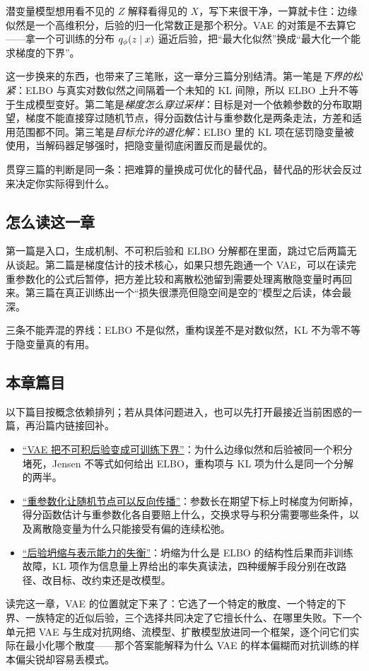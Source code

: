 潜变量模型想用看不见的 \(Z\) 解释看得见的 \(X\)，写下来很干净，一算就卡住：边缘似然是一个高维积分，后验的归一化常数正是那个积分。VAE 的对策是不去算它——拿一个可训练的分布 \(q_\phi(z\mid x)\) 逼近后验，把``最大化似然''换成``最大化一个能求梯度的下界''。

这一步换来的东西，也带来了三笔账，这一章分三篇分别结清。第一笔是\emph{下界的松紧}：ELBO 与真实对数似然之间隔着一个未知的 KL 间隙，所以 ELBO 上升不等于生成模型变好。第二笔是\emph{梯度怎么穿过采样}：目标是对一个依赖参数的分布取期望，梯度不能直接穿过随机节点，得分函数估计与重参数化是两条走法，方差和适用范围都不同。第三笔是\emph{目标允许的退化解}：ELBO 里的 KL 项在惩罚隐变量被使用，当解码器足够强时，把隐变量彻底闲置反而是最优的。

贯穿三篇的判断是同一条：把难算的量换成可优化的替代品，替代品的形状会反过来决定你实际得到什么。

\subsection{怎么读这一章}

第一篇是入口，生成机制、不可积后验和 ELBO 分解都在里面，跳过它后两篇无从谈起。第二篇是梯度估计的技术核心，如果只想先跑通一个 VAE，可以在读完重参数化的公式后暂停，把方差比较和离散松弛留到需要处理离散隐变量时再回来。第三篇在真正训练出一个``损失很漂亮但隐空间是空的''模型之后读，体会最深。

三条不能弄混的界线：ELBO 不是似然，重构误差不是对数似然，KL 不为零不等于隐变量真的有用。

\subsection{本章篇目}

以下篇目按概念依赖排列；若从具体问题进入，也可以先打开最接近当前困惑的一篇，再沿篇内链接回补。

\begin{itemize}
\tightlist
\item \hyperref[sec:14-Deep-Learning/06-Variational-Autoencoders/01]{``VAE 把不可积后验变成可训练下界''}：为什么边缘似然和后验被同一个积分堵死，Jensen 不等式如何给出 ELBO，重构项与 KL 项为什么是同一个分解的两半。
\item \hyperref[sec:14-Deep-Learning/06-Variational-Autoencoders/02]{``重参数化让随机节点可以反向传播''}：参数长在期望下标上时梯度为何断掉，得分函数估计与重参数化各自要赔上什么，交换求导与积分需要哪些条件，以及离散隐变量为什么只能接受有偏的连续松弛。
\item \hyperref[sec:14-Deep-Learning/06-Variational-Autoencoders/03]{``后验坍缩与表示能力的失衡''}：坍缩为什么是 ELBO 的结构性后果而非训练故障，KL 项作为信息量上界给出的率失真读法，四种缓解手段分别在改路径、改目标、改约束还是改模型。
\end{itemize}

读完这一章，VAE 的位置就定下来了：它选了一个特定的散度、一个特定的下界、一族特定的近似后验，三个选择共同决定了它擅长什么、在哪里失败。下一个单元把 VAE 与生成对抗网络、流模型、扩散模型放进同一个框架，逐个问它们实际在最小化哪个散度——那个答案能解释为什么 VAE 的样本偏糊而对抗训练的样本偏尖锐却容易丢模式。
